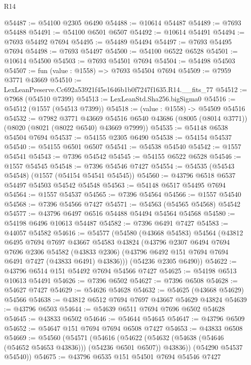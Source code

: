 \begin{lexlean}{R14}
\begin{coremodule}
@54487 := @54100 @2305 @6490
@54488 := @10614 @54487
@54489 := @7693 @54488
@54491 := @54100 @6501 @6507
@54492 := @10614 @54491
@54494 := @7693 @54492 @7694
@54495 := @54489 @54494
@54497 := @7693 @54495 @7694
@54498 := @7693 @54497
@54500 := @54100 @6522 @6528
@54501 := @10614 @54500
@54503 := @7693 @54501 @7694
@54504 := @54498 @54503
@54507 := fun (value : @1558) => @7693 @54504 @7694
@54509 := @7959 @3771 @43669
@54510 := LexLeanPreserve.Cc692a53921f45e1646b1b0f7247f1635.R14.__fits_77
@54512 := @7968 (@54510 @7399)
@54513 := LexLeanStd.Sha256.bigSigma0
@54516 := @54512 (@1557 (@54513 @7399))
@54518 := (value : @1558) -> @54509 @54516
@54532 := @7982
    @3771
    @43669
    @54516
    @6540
    @43686
    (@8005 (@8014 @3771))
    (@8020 (@8021 (@8022 @6540) @43669 @7999))
@54535 := @54148 @6538 @54504 @7694
@54537 := @54155 @2305 @6490
@54538 := @54154 @54537
@54540 := @54155 @6501 @6507
@54541 := @54538 @54540
@54542 := @1557 @54541
@54543 := @7396 @54542
@54545 := @54155 @6522 @6528
@54546 := @1557 @54545
@54548 := @7396 @54546 @7427
@54554 := @54535 (@54543 @54548) (@1557 (@54154 @54541 @54545))
@54560 := @43796 @6518 @6537 @54497 @54503 @54542 @54548
@54563 := @54148 @6517 @54495 @7694
@54564 := @1557 @54537
@54565 := @7396 @54564
@54566 := @1557 @54540
@54568 := @7396 @54566 @7427
@54571 := @54563 (@54565 @54568) @54542
@54577 := @43796 @6497 @6516 @54488 @54494 @54564 @54568
@54580 := @54198 @6496 @10613 @54487
@54582 := @7396 @6491 @7427
@54583 := @44057 @54582
@54616 := @54577
    (@54580
      (@43668 @54583)
      @54564
      (@43812
        @6495
        @7694
        @7697
        @43667
        @54583
        @43824
        (@43796
          @2307
          @6494
          @7694
          @7696
          @2306
          @54582
          (@43833 @2306)
          (@43796 @6492 @151 @7694 @7694 @6491 @7427 (@43833 @6491) @43836)))
      (@54236 @2305 @6490))
@54622 := @43796 @6514 @151 @54492 @7694 @54566 @7427
@54625 := @54198 @6513 @10613 @54491
@54626 := @7396 @6502
@54627 := @7396 @6508
@54628 := @54627 @7427
@54629 := @54626 @54628
@54632 := @54625 (@43668 @54629) @54566
@54638 := @43812 @6512 @7694 @7697 @43667 @54629 @43824
@54639 := @43796 @6503
@54644 := @54639 @6511 @7694 @7696 @6502 @54628
@54645 := @43833 @6502
@54646 := @54644 @54645
@54647 := @43796 @6509
@54652 := @54647 @151 @7694 @7694 @6508 @7427
@54653 := @43833 @6508
@54669 := @54560
    (@54571
      (@54616
        (@54622 (@54632 (@54638 (@54646 (@54652 @54653 @43836))) (@54236 @6501 @6507)) @43836))
      (@54290 @54537 @54540))
@54675 := @43796 @6535 @151 @54501 @7694 @54546 @7427

\end{coremodule}
\end{lexlean}
